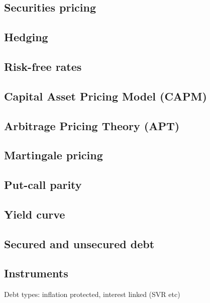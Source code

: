 
\subsection{Securities pricing}

\subsection{Hedging}

\subsection{Risk-free rates}

\subsection{Capital Asset Pricing Model (CAPM)}

\subsection{Arbitrage Pricing Theory (APT)}

\subsection{Martingale pricing}

\subsection{Put-call parity}

\subsection{Yield curve}

\subsection{Secured and unsecured debt}

\subsection{Instruments}
Debt types: inflation protected, interest linked (SVR etc)

